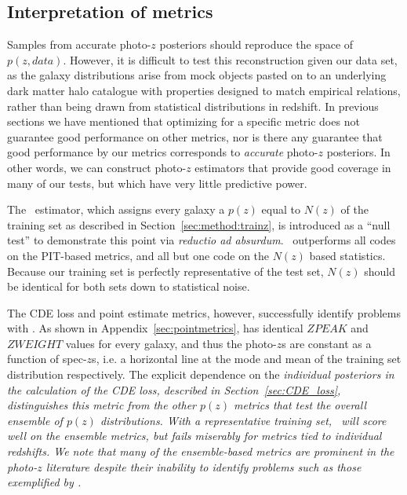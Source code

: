 \subsection{Interpretation of metrics}\label{sec:caution}

Samples from accurate photo-$z$ posteriors should reproduce the space of $p(z, data)$. However, it is difficult to test this reconstruction given our data set, as the galaxy distributions arise from mock objects pasted on to an underlying dark matter halo catalogue with properties designed to match empirical relations, rather than being drawn from statistical distributions in redshift.  In previous sections we have mentioned that optimizing for a specific metric does not guarantee good performance on other metrics, nor is there any guarantee that good performance by our metrics corresponds to \textit{accurate} photo-$z$ posteriors.
In other words, we can construct photo-$z$ estimators that provide good coverage in many of our tests, but which have very little predictive power.


The \trainz\ estimator, which assigns every galaxy a $p(z)$ equal to $N(z)$ of the training set as described in Section~\ref{sec:method:trainz}, is introduced as a ``null test'' to demonstrate this point via \textit{reductio ad absurdum}.
\trainz\ outperforms all codes on the PIT-based metrics, and all but one code on the $N(z)$ based statistics.
Because our training set is perfectly representative of the test set, $N(z)$ should be identical for both sets down to statistical noise.

The CDE loss and point estimate metrics, however, successfully identify problems with \trainz.
As shown in Appendix~\ref{sec:pointmetrics}, \trainz has identical $ZPEAK$ and $ZWEIGHT$ values for every galaxy, and thus the photo-$z$s are constant as a function of spec-$z$s, i.e. a horizontal line at the mode and mean of the training set distribution respectively.  The explicit dependence on the \it{individual} posteriors in the calculation of the CDE loss, described in Section~\ref{sec:CDE_loss}, distinguishes this metric from the other $p(z)$ metrics that test the overall ensemble of $p(z)$ distributions.  With a representative training set, \trainz\ will score well on the ensemble metrics, but fails miserably for metrics tied to individual redshifts.  We note that many of the ensemble-based metrics are prominent in the photo-$z$ literature despite their inability to identify problems such as those exemplified by \trainz.

